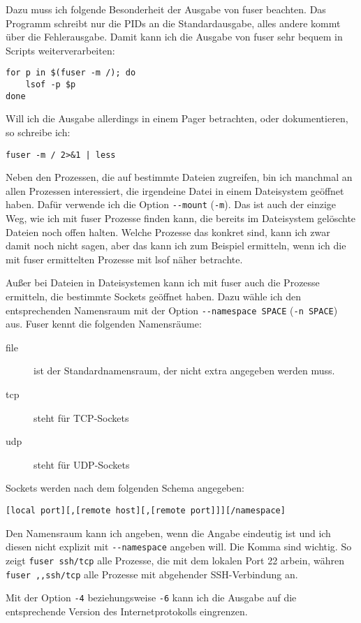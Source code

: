 \begin{normaltext}
  Dazu muss ich folgende Besonderheit der Ausgabe von fuser beachten. Das
  Programm schreibt nur die PIDs an die Standardausgabe, alles andere kommt
  über die Fehlerausgabe. Damit kann ich die Ausgabe von fuser sehr bequem in
  Scripts weiterverarbeiten:
  \begin{verbatim}
for p in $(fuser -m /); do
    lsof -p $p
done
  \end{verbatim}
  Will ich die Ausgabe allerdings in einem Pager betrachten, oder
  dokumentieren, so schreibe ich:
  \begin{verbatim}
fuser -m / 2>&1 | less
  \end{verbatim}

  Neben den Prozessen, die auf bestimmte Dateien zugreifen, bin ich manchmal
  an allen Prozessen interessiert, die irgendeine Datei in einem Dateisystem
  geöffnet haben. Dafür verwende ich die Option \verb?--mount? (\verb?-m?).
  Das ist auch der einzige Weg, wie ich mit fuser Prozesse finden kann, die
  bereits im Dateisystem gelöschte Dateien noch offen halten. Welche Prozesse
  das konkret sind, kann ich zwar damit noch nicht sagen, aber das kann ich
  zum Beispiel ermitteln, wenn ich die mit fuser ermittelten Prozesse mit lsof
  näher betrachte.

  Außer bei Dateien in Dateisystemen kann ich mit fuser auch die Prozesse
  ermitteln, die bestimmte Sockets geöffnet haben. Dazu wähle ich den
  entsprechenden Namensraum mit der Option \verb?--namespace SPACE?
  (\verb?-n SPACE?) aus. Fuser kennt die folgenden Namensräume:
  \begin{description}
    \item[file] ist der Standardnamensraum, der nicht extra angegeben werden
      muss.
    \item[tcp] steht für TCP-Sockets
    \item[udp] steht für UDP-Sockets
  \end{description}
  Sockets werden nach dem folgenden Schema angegeben:
  \begin{verbatim}
[local port][,[remote host][,[remote port]]][/namespace]
  \end{verbatim}
  Den Namensraum kann ich angeben, wenn die Angabe eindeutig ist und ich
  diesen nicht explizit mit \verb?--namespace? angeben will.
  Die Komma sind wichtig. So zeigt \verb?fuser ssh/tcp? alle Prozesse, die mit
  dem lokalen Port 22 arbein, währen \verb?fuser ,,ssh/tcp? alle Prozesse mit
  abgehender SSH-Verbindung an.

  Mit der Option \verb?-4? beziehungsweise \verb?-6? kann ich die Ausgabe auf
  die entsprechende Version des Internetprotokolls eingrenzen.


\end{normaltext}
